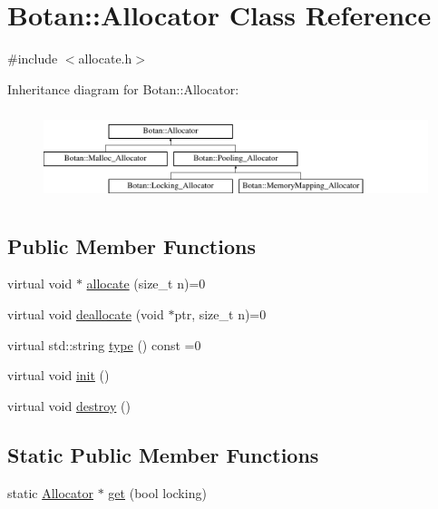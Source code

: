 \hypertarget{classBotan_1_1Allocator}{\section{Botan\-:\-:Allocator Class Reference}
\label{classBotan_1_1Allocator}
}


{\ttfamily \#include $<$allocate.\-h$>$}

Inheritance diagram for Botan\-:\-:Allocator\-:\begin{figure}[H]
\begin{center}
\leavevmode
\includegraphics[height=2.654028cm]{classBotan_1_1Allocator}
\end{center}
\end{figure}
\subsection*{Public Member Functions}
\begin{DoxyCompactItemize}
\item 
virtual void $\ast$ \hyperlink{classBotan_1_1Allocator_a2a67bd8efe4cd62f316396ed7e12227e}{allocate} (size\-\_\-t n)=0
\item 
virtual void \hyperlink{classBotan_1_1Allocator_a585549ec6e7098881b2ccdb2aea04bc5}{deallocate} (void $\ast$ptr, size\-\_\-t n)=0
\item 
virtual std\-::string \hyperlink{classBotan_1_1Allocator_aa3ade8ade033625cf1e4a790a72eea1e}{type} () const =0
\item 
virtual void \hyperlink{classBotan_1_1Allocator_a2f4f59036f1322a1b63613003bf4e338}{init} ()
\item 
virtual void \hyperlink{classBotan_1_1Allocator_aa2983098be356bb0dc284076036d4ac0}{destroy} ()
\end{DoxyCompactItemize}
\subsection*{Static Public Member Functions}
\begin{DoxyCompactItemize}
\item 
static \hyperlink{classBotan_1_1Allocator}{Allocator} $\ast$ \hyperlink{classBotan_1_1Allocator_af5467ea1365ca2bb347cb381f8665011}{get} (bool locking)
\end{DoxyCompactItemize}


